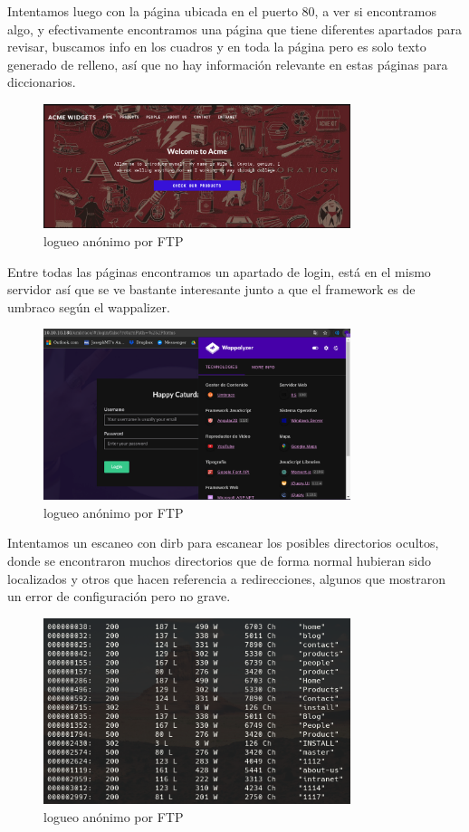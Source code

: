 \documentclass{article}
\begin{document}
Intentamos luego con la página ubicada en el puerto 80, a ver si encontramos algo, y efectivamente encontramos una página que tiene diferentes apartados para revisar, buscamos info en los cuadros y en toda la página pero es solo texto generado de relleno, así que no hay información relevante en estas páginas para diccionarios.
\begin{figure}[h]
	\center 
	\includegraphics[width=0.8\textwidth]{images/remote/index_pagina.png}
	\caption{logueo anónimo por FTP}
\end{figure}

\clearpage

Entre todas las páginas encontramos un apartado de login, está en el mismo servidor así que se ve bastante interesante junto a que el framework es de umbraco según el wappalizer.
\begin{figure}[h]
	\center 
	\includegraphics[width=0.8\textwidth]{images/remote/wappalizer.png}
	\caption{logueo anónimo por FTP}
\end{figure}

Intentamos un escaneo con dirb para escanear los posibles directorios ocultos, donde se encontraron muchos directorios que de forma normal hubieran sido localizados y otros que hacen referencia a redirecciones, algunos que mostraron un error de configuración pero no grave.
\begin{figure}[h]
	\center 
	\includegraphics[width=0.8\textwidth]{images/remote/dirb.png}
	\caption{logueo anónimo por FTP}
\end{figure}
\end{document}
